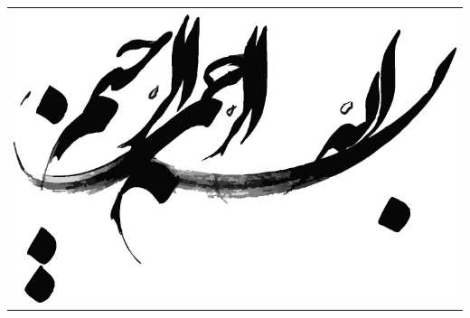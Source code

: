 \documentclass[twoside, a4paper,11pt]{book}
\numberwithin{equation}{chapter}
\numberwithin{table}{chapter}
\numberwithin{figure}{chapter}
\numberwithin{equation}{chapter}
\begin{document}
\newpage
\thispagestyle{empty}
\begin{tabular}{c}
\vspace{5cm}\\
\includegraphics[width=16cm]{Figures/besm.pdf}\\
\end{tabular}
%


\newpage
\thispagestyle{empty}
\mbox{}
\end{document}
